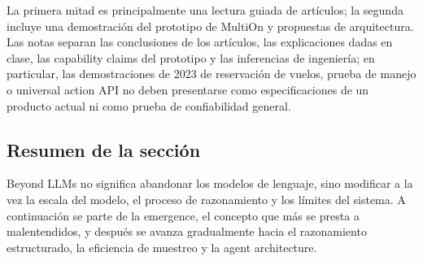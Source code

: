 La primera mitad es principalmente una lectura guiada de artículos; la segunda incluye una demostración del prototipo de MultiOn y propuestas de arquitectura. Las notas separan las conclusiones de los artículos, las explicaciones dadas en clase, las capability claims del prototipo y las inferencias de ingeniería; en particular, las demostraciones de 2023 de reservación de vuelos, prueba de manejo o universal action API no deben presentarse como especificaciones de un producto actual ni como prueba de confiabilidad general.

\subsection{Resumen de la sección}

Beyond LLMs no significa abandonar los modelos de lenguaje, sino modificar a la vez la escala del modelo, el proceso de razonamiento y los límites del sistema. A continuación se parte de la emergence, el concepto que más se presta a malentendidos, y después se avanza gradualmente hacia el razonamiento estructurado, la eficiencia de muestreo y la agent architecture.
